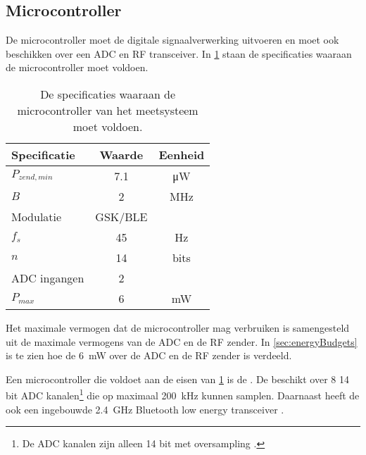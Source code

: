 \subsection{Microcontroller}
De microcontroller moet de digitale signaalverwerking uitvoeren en moet ook beschikken over een ADC en RF transceiver. In \cref{tab:specMCU} staan de specificaties waaraan de microcontroller moet voldoen.
\begin{table}[!htb]
    \centering
    \begin{tabular}{l|c|c}
        Specificatie    & Waarde    & Eenheid \\\hline
        $P_{zend,min}$  & 7.1       & \si{\micro\watt}  \\
        $B$             & 2         & \si{\mega\hertz}  \\
        Modulatie       & GSK/BLE   &                   \\\hline
        $f_s$           & 45        & \si{\hertz}       \\
        $n$             & 14        & bits              \\
        ADC ingangen    & 2         &                   \\\hline
        $P_{max}$       & 6         & \si{\milli\watt}
    \end{tabular}
    \caption{De specificaties waaraan de microcontroller van het \si{\pH} meetsysteem moet voldoen.}
    \label{tab:specMCU}
\end{table}
Het maximale vermogen dat de microcontroller mag verbruiken is samengesteld uit de maximale vermogens van de ADC en de RF zender. In \cref{sec:energyBudgets} is te zien hoe de \qty{6}{\milli\watt} over de ADC en de RF zender is verdeeld.


Een microcontroller die voldoet aan de eisen van \cref{tab:specMCU} is de \mcu. De \mcu beschikt over 8 14 bit ADC kanalen\footnote{De ADC kanalen zijn alleen 14 bit met oversampling \cite{nrf52810}.} die op maximaal \qty{200}{\kilo\hertz} kunnen samplen. Daarnaast heeft de \mcu ook een ingebouwde \qty{2.4}{\giga\hertz} Bluetooth low energy transceiver \cite{nrf52810}.


